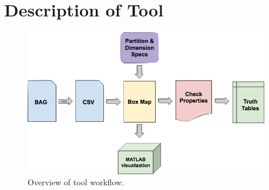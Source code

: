 \section{Description of Tool}
\label{sec:tool}

\begin{figure}[ht]
  \centering
  \includegraphics[width=0.95\textwidth]{./figures/workflow}
  \caption{Overview of tool workflow.}
  \label{fig:workflow}
\end{figure}
